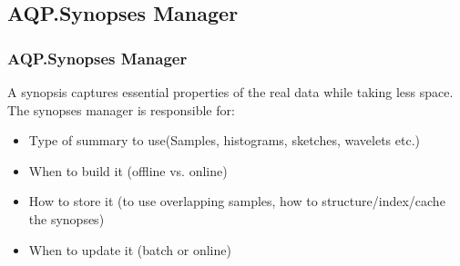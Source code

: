 \documentclass{beamer}
\begin{document}

\subsection{AQP.Synopses Manager}
\begin{frame}
\frametitle{AQP.Synopses Manager}
A synopsis captures essential properties of the real data while taking less space.
\vspace{0.3 cm}
The synopses manager is responsible for:
\begin{itemize}
\item{Type of summary to use(Samples, histograms, sketches, wavelets etc.)}
\item{When to build it (offline vs. online)}
\item{How to store it (to use overlapping samples, how to structure/index/cache the synopses)}
\item{When to update it (batch or online)}
\end{itemize}
\end{frame}
\end{document}
